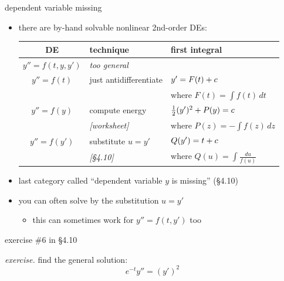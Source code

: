 \documentclass[dvipsnames,colorlinks]{beamer}
\begin{document}
\begin{frame}{dependent variable missing}

\begin{itemize}
\item there are by-hand solvable nonlinear 2nd-order DEs:

\bigskip
\small
\begin{tabular}{c|l|l}
DE & technique & first integral \\ \hline \hline
$y'' = f(t,y,y')$ & \emph{too general} &  \\ \hline
$y'' = f(t)$ & just antidifferentiate & $y' = F(t)+c \large\strut$ \\
& & where $F(t) = \int f(t)\,dt$ \\ \hline
$y'' = f(y)$ & compute energy & $\frac{1}{2} (y')^2 + P(y) = c \large\strut$\\
& \emph{[worksheet]} & where $P(z) = -\int f(z)\,dz$ \\ \hline
$y'' = f(y')$ & substitute $u=y'$ & $Q(y') = t + c \large\strut$\\
& \emph{[\S4.10]} & where $Q(u)=\int \frac{du}{f(u)}$
\end{tabular}

\normalsize

\bigskip
\item last category called ``dependent variable $y$ is missing'' (\S4.10)
\item you can often solve by the substitution $u=y'$
    \begin{itemize}
    \item this can sometimes work for $y'' = f(t,y')$ too
    \end{itemize}
\end{itemize}
\end{frame}


\begin{frame}{exercise \#6 in \S 4.10}

\noindent \emph{exercise.}  find the general solution:
    $$e^{-t} y'' = (y')^2$$

\vspace{60mm}
\end{frame}
\end{document}
